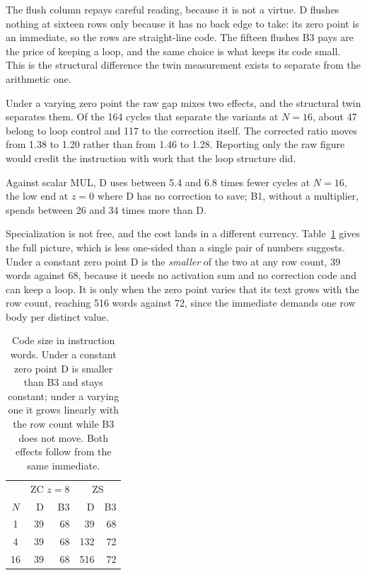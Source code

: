 The flush column repays careful reading, because it is not a virtue. D
flushes nothing at sixteen rows only because it has no back edge to take: its
zero point is an immediate, so the rows are straight-line code. The fifteen
flushes B3 pays are the price of keeping a loop, and the same choice is what
keeps its code small. This is the structural difference the twin measurement
exists to separate from the arithmetic one.

Under a varying zero point the raw gap mixes two effects, and the structural
twin separates them. Of the 164 cycles that separate the variants at
\(N{=}16\), about 47 belong to loop control and 117 to the correction itself.
The corrected ratio moves from 1.38 to 1.20 rather than from 1.46 to 1.28.
Reporting only the raw figure would credit the instruction with work that the
loop structure did.

Against scalar MUL, D uses between 5.4 and 6.8 times fewer cycles at
\(N{=}16\), the low end at \(z{=}0\) where D has no correction to save; B1,
without a multiplier, spends between 26 and 34 times more than D.

Specialization is not free, and the cost lands in a different currency.
Table~\ref{tab:code} gives the full picture, which is less one-sided than a
single pair of numbers suggests. Under a constant zero point D is the
\emph{smaller} of the two at any row count, 39 words against 68, because it
needs no activation sum and no correction code and can keep a loop. It is only
when the zero point varies that its text grows with the row count, reaching 516
words against 72, since the immediate demands one row body per distinct value.

\begin{table}[!htbp]
\caption{Code size in instruction words. Under a constant zero point D is
smaller than B3 and stays constant; under a varying one it grows linearly with
the row count while B3 does not move. Both effects follow from the same
immediate.}
\label{tab:code}
\centering
\begin{tabular}{crrrr}
\hline
 & \multicolumn{2}{c}{ZC \(z{=}8\)} & \multicolumn{2}{c}{ZS} \\
\(N\) & D & B3 & D & B3 \\
\hline
1 & 39 & 68 & 39 & 68 \\
4 & 39 & 68 & 132 & 72 \\
16 & 39 & 68 & 516 & 72 \\
\hline
\end{tabular}
\end{table}


